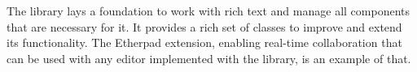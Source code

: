 



The library lays a foundation to work with rich text and manage all components that are necessary for it. It provides a rich set of classes to improve and extend its functionality. The Etherpad extension, enabling real-time collaboration that can be used with any editor implemented with the library, is an example of that.




